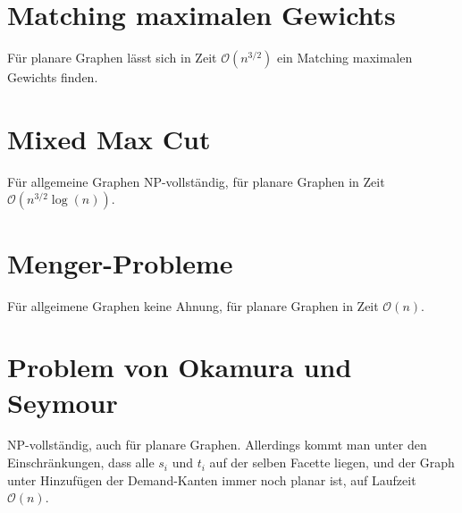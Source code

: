 \documentclass[a4paper,11pt]{report}
\begin{document}
\section{Matching maximalen Gewichts}
Für planare Graphen lässt sich in Zeit $\mathcal{O}(n^{3/2})$ ein Matching maximalen Gewichts finden.


\section{Mixed Max Cut}
Für allgemeine Graphen NP-vollständig, für planare Graphen in Zeit $\mathcal{O}(n^{3/2} \log(n))$.


\section{Menger-Probleme}
Für allgeimene Graphen keine Ahnung, für planare Graphen in Zeit $\mathcal{O}(n)$.


\section{Problem von Okamura und Seymour}
NP-vollständig, auch für planare Graphen. Allerdings kommt man unter den Einschränkungen, dass alle $s_i$ und $t_i$ auf der selben Facette liegen, und der Graph unter Hinzufügen der Demand-Kanten immer noch planar ist, auf Laufzeit $\mathcal{O}(n)$.


\glsaddallunused
\printglossaries
\end{document}
